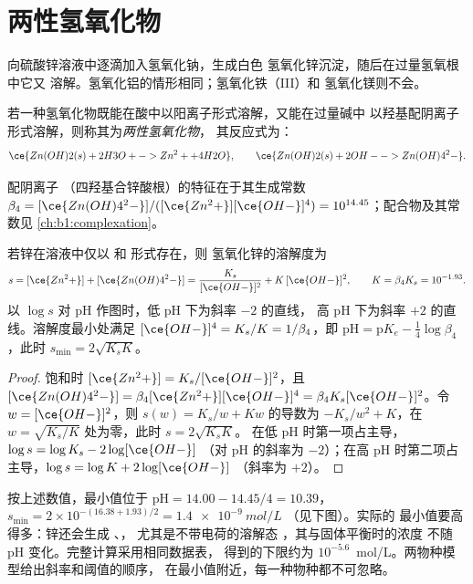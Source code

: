 \section{两性氢氧化物}\label{sec:b1:precipitation:amphoteric}

向硫酸锌溶液中逐滴加入氢氧化钠，生成白色
氢氧化锌沉淀，随后在过量氢氧根中它又
溶解。氢氧化铝的情形相同；氢氧化铁（III）和
氢氧化镁则不会。

\begin{definition}[两性氢氧化物]\label{def:b1:precipitation:amphoteric-hydroxide}
若一种氢氧化物既能在酸中以阳离子形式溶解，又能在过量碱中
以羟基配阴离子形式溶解，则称其为\emph{两性氢氧化物}，
其反应式为：
\[
  \ce{Zn(OH)2(s) + 2H3O+ -> Zn^2+ + 4H2O}, \qquad
  \ce{Zn(OH)2(s) + 2OH- -> Zn(OH)4^2-} .
\]
\end{definition}

配阴离子 （四羟基合锌酸根）的特征在于其生成常数
$\beta_4 = [\ce{Zn(OH)4^2-}]/([\ce{Zn^2+}][\ce{OH-}]^4)
= 10^{14.45}$；配合物及其常数见
\cref{ch:b1:complexation}。

\begin{proposition}[两性氢氧化物的溶解度]\label{prop:b1:precipitation:amphoteric}
若锌在溶液中仅以  和  形式存在，则
氢氧化锌的溶解度为
\[
  s = [\ce{Zn^2+}] + [\ce{Zn(OH)4^2-}] = \frac{K_s}{[\ce{OH-}]^2} + K\,[\ce{OH-}]^2,
  \qquad K = \beta_4 K_s = 10^{-1.93} .
\]
以 $\log s$ 对 pH 作图时，低 pH 下为斜率 $-2$ 的直线，
高 pH 下为斜率 $+2$ 的直线。溶解度最小处满足
$[\ce{OH-}]^4 = K_s/K = 1/\beta_4$，即 $\mathrm{pH} =
\mathrm{p}K_e - \frac14\log\beta_4$，此时 $s_{\min} = 2\sqrt{K_s K}$。
\end{proposition}

\begin{proof}
饱和时 $[\ce{Zn^2+}] = K_s/[\ce{OH-}]^2$，且
$[\ce{Zn(OH)4^2-}] = \beta_4[\ce{Zn^2+}][\ce{OH-}]^4 = \beta_4 K_s
[\ce{OH-}]^2$。令 $w = [\ce{OH-}]^2$，则 $s(w) = K_s/w + Kw$ 的导数为
$-K_s/w^2 + K$，在 $w = \sqrt{K_s/K}$ 处为零，此时 $s = 2\sqrt{K_s K}$。
在低 pH 时第一项占主导，$\log s = \log K_s - 2\log[\ce{OH-}]$
（对 pH 的斜率为 $-2$）；在高 pH 时第二项占主导，$\log s = \log K + 2\log[\ce{OH-}]$
（斜率为 $+2$）。
\end{proof}

按上述数值，最小值位于 $\mathrm{pH} = 14.00 - 14.45/4
= 10.39$，$s_{\min} = 2 \times 10^{-(16.38 + 1.93)/2} =
\qty{1.4e-9}{mol/L}$
（见下图）。实际的
最小值要高得多：锌还会生成 、，
尤其是不带电荷的溶解态 ，其与固体平衡时的浓度
不随 pH 变化。完整计算采用相同数据表，
得到的下限约为
$10^{-5.6}$~mol/L。两物种模型给出斜率和阈值的顺序，
在最小值附近，每一种物种都不可忽略。

